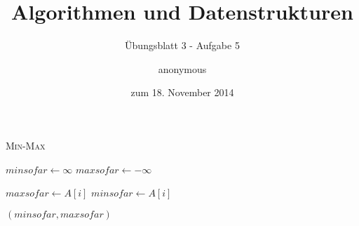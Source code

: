 \documentclass[a4paper]{scrartcl}
\title{Algorithmen und Datenstrukturen}
\subtitle{Übungsblatt 3 - Aufgabe 5}
\author{
    anonymous
}
\date{zum 18. November 2014}
\begin{document}
\maketitle


\begin{algorithm}
    \caption{\textsc{Min-Max}}
    \begin{algorithmic}[1]

        \State $minsofar \gets \infty$
        \State $maxsofar \gets -\infty$

                \State $maxsofar \gets A[i]$
                \State $minsofar \gets A[i]$
            \EndIf
        \EndFor

        \State \Return $(minsofar, maxsofar)$

        \EndProcedure
    \end{algorithmic}
\end{algorithm}
\end{document}
